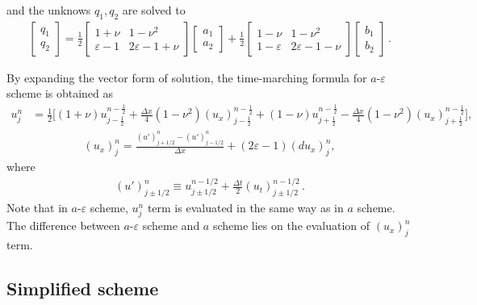 \documentclass[letterpaper,12pt,dvips]{article}
\numberwithin{equation}{section}
\begin{document}
and the unknows $q_1, q_2$ are solved to
\begin{align*}
  \left[\begin{array}{c} q_1 \\ q_2 \end{array}\right]
    = \frac{1}{2}\left[\begin{array}{cc} 1+\nu & 1-\nu^2 \\
      \varepsilon-1 & 2\varepsilon-1+\nu \end{array}\right]
      \left[\begin{array}{c} a_1 \\ a_2 \end{array}\right]
    + \frac{1}{2}\left[\begin{array}{cc} 1-\nu & 1-\nu^2 \\
      1-\varepsilon & 2\varepsilon - 1 - \nu \end{array}\right]
  \left[\begin{array}{c} b_1 \\ b_2 \end{array}\right]\,.
\end{align*}

By expanding the vector form of solution, the time-marching formula for 
$a$-$\varepsilon$ scheme is obtained as 
\begin{align}
  u_j^n &= \frac{1}{2}\Big[
      (1+\nu)u_{j-\frac{1}{2}}^{n-\frac{1}{2}} 
    + \frac{\Delta x}{4}(1-\nu^2)(u_x)_{j-\frac{1}{2}}^{n-\frac{1}{2}}
    + (1-\nu)u_{j+\frac{1}{2}}^{n-\frac{1}{2}}
    - \frac{\Delta x}{4}(1-\nu^2)(u_x)_{j+\frac{1}{2}}^{n-\frac{1}{2}}
  \Big], \label{e:aeu}
\end{align}
\begin{align}
  (u_x)_j^n = \frac{(u')_{j+1/2}^n - (u')_{j-1/2}^n}{\Delta x}
            + (2\varepsilon-1)(du_x)_j^n, \label{e:aeux}
\end{align}
where
\begin{align*}
  (u')_{j\pm1/2}^n \equiv
    u_{j\pm1/2}^{n-1/2}+\frac{\Delta t}{2}(u_t)_{j\pm1/2}^{n-1/2}\,.
\end{align*}
Note that in $a$-$\varepsilon$ scheme, $u_j^n$ term is evaluated in the 
same way as in $a$ scheme.
The difference between $a$-$\varepsilon$ scheme and $a$ scheme lies on 
the evaluation of $(u_x)_j^n$ term.

\subsection{Simplified scheme}
\end{document}
